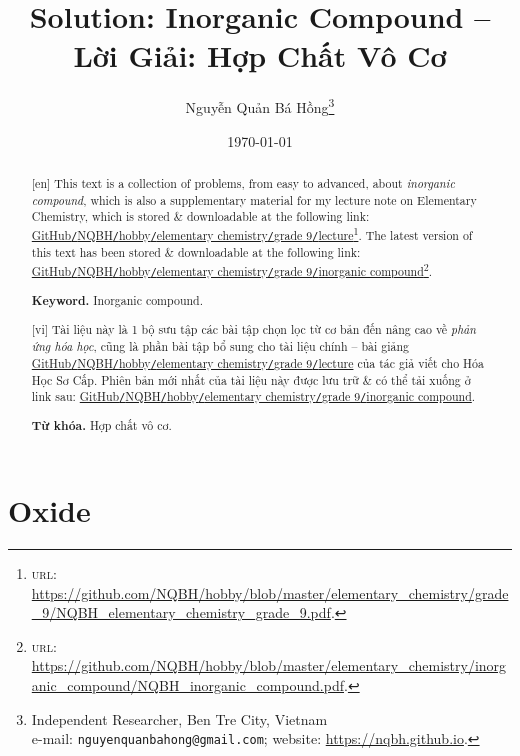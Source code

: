 \documentclass{article}
\title{Solution: Inorganic Compound -- Lời Giải: Hợp Chất Vô Cơ}
\author{Nguyễn Quản Bá Hồng\footnote{Independent Researcher, Ben Tre City, Vietnam\\e-mail: \texttt{nguyenquanbahong@gmail.com}; website: \url{https://nqbh.github.io}.}}
\date{\today}
\begin{document}
\maketitle
\begin{abstract}
	\textsf{[en]} This text is a collection of problems, from easy to advanced, about \textit{inorganic compound}, which is also a supplementary material for my lecture note on Elementary Chemistry, which is stored \& downloadable at the following link: \href{https://github.com/NQBH/hobby/blob/master/elementary_chemistry/grade_9/NQBH_elementary_chemistry_grade_9.pdf}{GitHub\texttt{/}NQBH\texttt{/}hobby\texttt{/}elementary chemistry\texttt{/}grade 9\texttt{/}lecture}\footnote{\textsc{url}: \url{https://github.com/NQBH/hobby/blob/master/elementary_chemistry/grade_9/NQBH_elementary_chemistry_grade_9.pdf}.}. The latest version of this text has been stored \& downloadable at the following link: \href{https://github.com/NQBH/hobby/blob/master/elementary_chemistry/inorganic_compound/NQBH_inorganic_compound.pdf}{GitHub\texttt{/}NQBH\texttt{/}hobby\texttt{/}elementary chemistry\texttt{/}grade 9\texttt{/}inorganic compound}\footnote{\textsc{url}: \url{https://github.com/NQBH/hobby/blob/master/elementary_chemistry/inorganic_compound/NQBH_inorganic_compound.pdf}.}.
	
	\textsf{\textbf{Keyword.} Inorganic compound.}
	\vspace{2mm}
	
	\textsf{[vi]} Tài liệu này là 1 bộ sưu tập các bài tập chọn lọc từ cơ bản đến nâng cao về \textit{phản ứng hóa học}, cũng là phần bài tập bổ sung cho tài liệu chính -- bài giảng \href{https://github.com/NQBH/hobby/blob/master/elementary_chemistry/grade_9/NQBH_elementary_chemistry_grade_9.pdf}{GitHub\texttt{/}NQBH\texttt{/}hobby\texttt{/}elementary chemistry\texttt{/}grade 9\texttt{/}lecture} của tác giả viết cho Hóa Học Sơ Cấp. Phiên bản mới nhất của tài liệu này được lưu trữ \& có thể tải xuống ở link sau: \href{https://github.com/NQBH/hobby/blob/master/elementary_chemistry/grade_9/real/NQBH_real.pdf}{GitHub\texttt{/}NQBH\texttt{/}hobby\texttt{/}elementary chemistry\texttt{/}grade 9\texttt{/}inorganic compound}.
	
	\textsf{\textbf{Từ khóa.} Hợp chất vô cơ.}
\end{abstract}
\setcounter{secnumdepth}{4}
\setcounter{tocdepth}{3}
\tableofcontents
\newpage


\section{Oxide}
\end{document}
